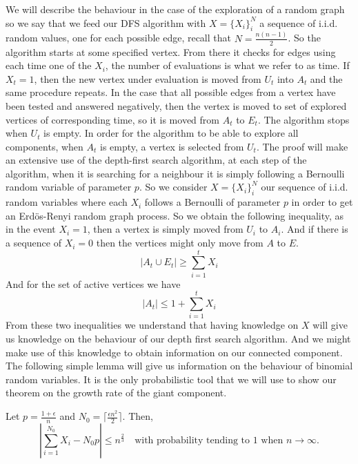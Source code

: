 We will describe the behaviour in the case of the exploration of a random graph so we say that we feed our DFS algorithm with $X = \{X_i\}_i^N$ a sequence of i.i.d. random values, one for each possible edge, recall that $N = \frac{n(n-1)}{2}$.
So the algorithm starts at some specified vertex. From there it checks for edges using each time one of the $X_i$, the number of evaluations is what we refer to as time.
If $X_t = 1$, then the new vertex under evaluation is moved from $U_t$ into $A_t$ and the same procedure repeats. 
In the case that all possible edges from a vertex have been tested and answered negatively, then the vertex is moved to set of explored vertices of corresponding time, so it is moved from $A_t$ to $E_t$.
The algorithm stops when $U_t$ is empty.
\newline
In order for the algorithm to be able to explore all components, when $A_t$ is empty, a vertex is selected from $U_t$.
\newline
The proof will make an extensive use of the depth-first search algorithm, at each step of the algorithm, when it is searching for a neighbour it is simply following a Bernoulli random variable of parameter $p$.
So we consider $X = \{X_i\}_i^N$ our sequence of i.i.d. random variables where each $X_i$ follows a Bernoulli of parameter $p$ in order to get an Erd\"os-Renyi random graph process.
So we obtain the following inequality, as in the event $X_i = 1$, then a vertex is simply moved from $U_i$ to $A_i$. And if there is a sequence of $X_i = 0$ then the vertices might only move from $A$ to $E$.  
\begin{equation}
	|A_t \cup E_t| \geq \sum_{i=1}^t X_i
\end{equation} 
And for the set of active vertices we have
\begin{equation}\label{eq:At}
	|A_t| \leq 1 + \sum_{i=1}^t X_i
\end{equation}
From these two inequalities we understand that having knowledge on $X$ will give us knowledge on the behaviour of our depth first search algorithm. And we might make use of this knowledge to obtain information on our connected component.
\newline
The following simple lemma will give us information on the behaviour of binomial random variables. It is the only probabilistic tool that we will use to show our theorem on the growth rate of the giant component.
\begin{lemma}\label{lemmaN0}
	Let $p = \frac{1+\epsilon}{n}$ and $N_0 = \lceil\frac{\epsilon n^2}{2}\rceil$. Then, 
	\begin{equation}
	|\sum_{i=1}^{N_0} X_{i} - N_0 p| \leq n^{\frac{2}{3}} \quad \text{with probability tending to 1 when $n\to \infty$.}
	\end{equation}
\end{lemma}
